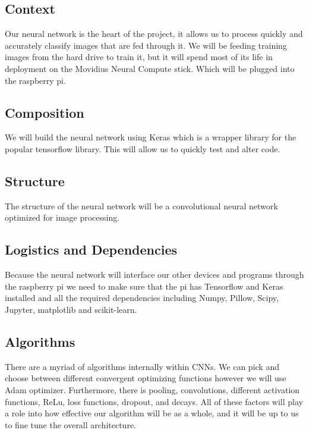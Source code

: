 \subsection{Context} Our neural network is the heart of the project, it allows us to process quickly and accurately classify images that are fed through it. We will be feeding training images from the hard drive to train it, but it will spend most of its life in deployment on the Movidius Neural Compute stick. Which will be plugged into the raspberry pi.
 \subsection{Composition} We will build the neural network using Keras which is a wrapper library for the popular tensorflow library. This will allow us to quickly test and alter code. 
\subsection{Structure} The structure of the neural network will be a convolutional neural network optimized for image processing. 
\subsection{Logistics and Dependencies} Because the neural network will interface our other devices and programs through the raspberry pi we need to make sure that the pi has Tensorflow and Keras installed and all the required dependencies including Numpy, Pillow, Scipy, Jupyter, matplotlib and scikit-learn. 
\subsection{Algorithms} There are a myriad of algorithms internally within CNNs. We can pick and choose between different convergent optimizing functions however we will use Adam optimizer. Furthermore, there is pooling, convolutions, different activation functions, ReLu, loss functions, dropout, and decays. All of these factors will play a role into how effective our algorithm will be as a whole, and it will be up to us to fine tune the overall architecture. 
